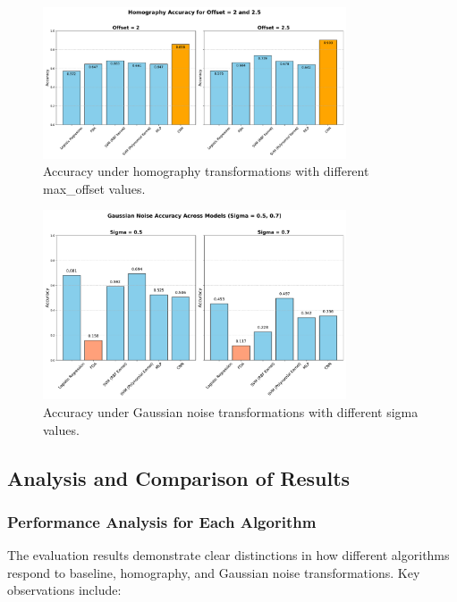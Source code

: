 \documentclass{article}
\begin{document}
\begin{figure}[h!]
    \centering
    \includegraphics[width=0.8\textwidth]{images/homography.pdf}
    \caption{Accuracy under homography transformations with different max\_offset values.}
    \label{fig:homography_accuracy}
\end{figure}

\begin{figure}[h!]
    \centering
    \includegraphics[width=0.8\textwidth]{images/gaussian_noise.pdf}
    \caption{Accuracy under Gaussian noise transformations with different sigma values.}
    \label{fig:gaussian_noise_accuracy}
\end{figure}

\subsection{Analysis and Comparison of Results}

\subsubsection{Performance Analysis for Each Algorithm}
The evaluation results demonstrate clear distinctions in how different algorithms respond to baseline, homography, and Gaussian noise transformations. Key observations include:
\end{document}
